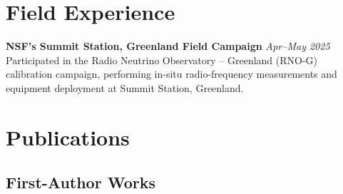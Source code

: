 \documentclass[10pt]{report}
\begin{document}
\section*{Field Experience}

\noindent
\textbf{NSF's Summit Station, Greenland Field Campaign} \textit{Apr--May 2025} \\
Participated in the Radio Neutrino Observatory -- Greenland (RNO-G) calibration campaign, performing in-situ radio-frequency measurements and equipment deployment at Summit Station, Greenland.


\section*{Publications}
\subsection*{First-Author Works}
\end{document}
